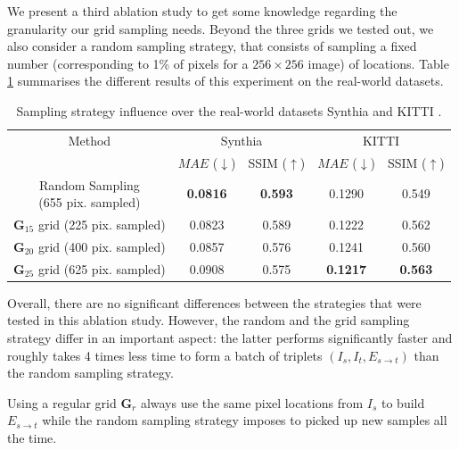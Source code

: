 We present a third ablation study to get some knowledge regarding the granularity our grid sampling needs. Beyond the three grids we tested out, we also consider a random sampling strategy, that consists of sampling a fixed number (corresponding to 1\% of pixels for a $256\times 256$ image) of locations. Table \ref{tab:3} summarises the different results of this experiment on the real-world datasets.
\begin{table}[h!]
\begin{center}
\begin{tabular}{ccccc}
\hline
Method & \multicolumn{2}{c}{Synthia} & \multicolumn{2}{c}{KITTI} \\
 & $MAE$ ($\downarrow$) & SSIM ($\uparrow$) & $MAE$ ($\downarrow$) & SSIM ($\uparrow$) \\
\hline
\makecell{ Random Sampling \\ \footnotesize{(655 pix. sampled)}}& \textbf{0.0816} & \textbf{0.593} & 0.1290 & 0.549   \\ \hline
\makecell{$\textbf{G}_{15}$ grid \\ \footnotesize{(225 pix. sampled)}} & 0.0823 & 0.589 & 0.1222 & 0.562   \\ \hline
\makecell{$\textbf{G}_{20}$ grid \\ \footnotesize{(400 pix. sampled)}} & 0.0857 & 0.576 & 0.1241 & 0.560  \\ \hline
\makecell{$\textbf{G}_{25}$ grid \\ \footnotesize{(625 pix. sampled)}} & 0.0908 & 0.575 & \textbf{0.1217} & \textbf{0.563}   \\ \hline
\hline
\end{tabular}
\end{center}
\caption{Sampling strategy influence over the real-world datasets Synthia 
 \cite{ros2016synthia} and KITTI \cite{geiger2012we}.}
\label{tab:3}
\end{table}

Overall, there are no significant differences between the strategies that were tested in this ablation study.  However, the random and the grid sampling strategy differ in an important aspect: the latter performs significantly faster and roughly takes 4 times less time to form a batch of triplets $\left(I_{s},I_{t},E_{s\xrightarrow{}t}\right)$ than the random sampling strategy. \newline

Using a regular grid $\textbf{G}_{r}$ always use the same pixel locations from $I_s$ to build  $E_{s\xrightarrow{}t}$ while the random sampling strategy imposes to picked up new samples all the time.  

